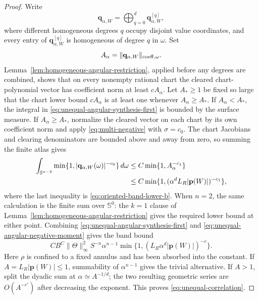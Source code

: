 \documentclass[11pt]{article}
\numberwithin{equation}{section}
\theoremstyle{remark}
\theoremstyle{definition}
\newcommand{\Sph}{\mathbb S}
\newcommand{\norm}[1]{\lVert #1\rVert}
\newcommand{\abs}[1]{\lvert #1\rvert}
\begin{document}
\begin{proof}
Write
\[
 \mathbf q_{\alpha,W}
 =\bigoplus_{q=0}^d\mathbf q_{\alpha,W}^{[q]},
\]
where different homogeneous degrees $q$ occupy disjoint value
coordinates, and every entry of $\mathbf q_{\alpha,W}^{[q]}$ is
homogeneous of degree $q$ in $\omega$.
Set
\[
 A_\alpha=\norm{\mathbf q_{\alpha,W}}_{{\rm coeff},\omega}.
\]
Lemma~\ref{lem:homogeneous-angular-restriction}, applied before any
degrees are combined, shows that on every nonempty rational chart the
cleared chart-polynomial vector has coefficient norm at least $cA_\alpha$.
Let $A_*\ge1$ be fixed so large that the chart lower bound
$cA_\alpha$ is at least one whenever $A_\alpha\ge A_*$.  If
$A_\alpha<A_*$, the integral in
\eqref{eq:unequal-angular-synthesis-first} is bounded by the surface
measure.  If $A_\alpha\ge A_*$, normalize the cleared vector on each chart by
its own coefficient norm and apply \eqref{eq:multi-negative} with
$\sigma=c_0$.  The chart Jacobians and clearing denominators are bounded
above and away from zero, so summing the finite atlas gives
\begin{align}
 \int_{\Sph^{n-2}}
  \min\{1,|\mathbf q_{\alpha,W}(\omega)|^{-c_0}\}\,d\omega
 &\le C\min\{1,A_\alpha^{-c_1}\}\notag\\
 &\le C\min\{1,
    (\alpha^dL_R|\mathbf p(W)|)^{-c_1}\},
 \label{eq:unequal-angular-negative-moment}
\end{align}
where the last inequality is
\eqref{eq:oriented-band-lower-b}.  When $n=2$, the same calculation is
the finite sum over $\Sph^0$: the $k=1$ clause of
Lemma~\ref{lem:homogeneous-angular-restriction} gives the required lower
bound at either point.  Combining
\eqref{eq:unequal-angular-synthesis-first} and
\eqref{eq:unequal-angular-negative-moment} gives the band bound
\begin{equation}\label{eq:unequal-band-bound}
 CB^C\norm\Theta_\infty^2S^{-n}\alpha^{n-1}
 \min\{1,(L_R\alpha^d\abs{\mathbf p(W)})^{-c}\}.
\end{equation}
Here \(\rho\) is confined to a fixed annulus and has been absorbed into
the constant.  If
\(A=L_R|\mathbf p(W)|\le1\), summability of \(\alpha^{n-1}\) gives the
trivial alternative.  If \(A>1\), split the dyadic sum at
\(\alpha\simeq A^{-1/d}\); the two resulting geometric series are
\(O(A^{-c'})\) after decreasing the exponent.  This proves
\eqref{eq:unequal-correlation}.


\end{proof}
\end{document}
